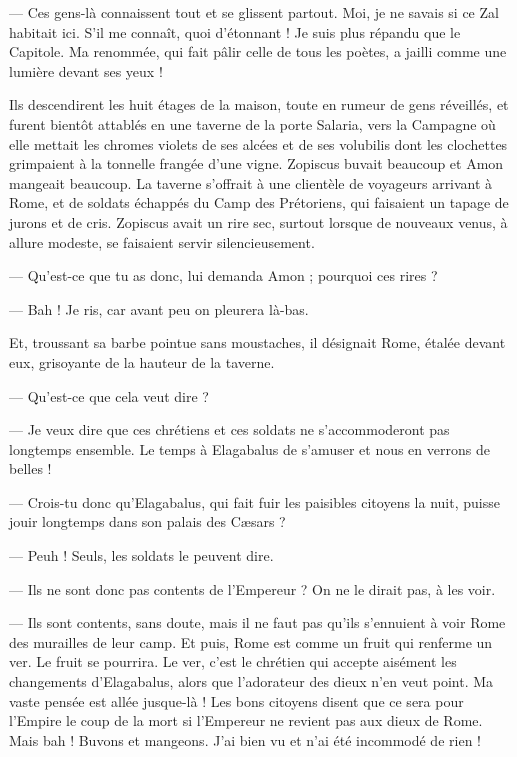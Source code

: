 \documentclass[a4paper, 11pt, oneside, polutonikogreek, french]{article}
\begin{document}
--- Ces gens-là connaissent tout et se glissent partout. Moi, je ne savais si ce Zal habitait ici. S'il me connaît, quoi d'étonnant ! Je suis plus répandu que le Capitole. Ma renommée, qui fait pâlir celle de tous les poètes, a jailli comme une lumière devant ses yeux !

Ils descendirent les huit étages de la maison, toute en rumeur de gens réveillés, et furent bientôt attablés en une taverne de la porte Salaria, vers la Campagne où elle mettait les chromes violets de ses alcées et de ses volubilis dont les clochettes grimpaient à la tonnelle frangée d'une vigne. Zopiscus buvait beaucoup et Amon mangeait beaucoup. La taverne s'offrait à une clientèle de voyageurs arrivant à Rome, et de soldats échappés du Camp des Prétoriens, qui faisaient un tapage de jurons et de cris. Zopiscus avait un rire sec, surtout lorsque de nouveaux venus, à allure modeste, se faisaient servir silencieusement.

--- Qu'est-ce que tu as donc, lui demanda Amon ; pourquoi ces rires ?

--- Bah ! Je ris, car avant peu on pleurera là-bas.

Et, troussant sa barbe pointue sans moustaches, il désignait Rome, étalée devant eux, grisoyante de la hauteur de la taverne.

--- Qu'est-ce que cela veut dire ?

--- Je veux dire que ces chrétiens et ces soldats ne s'accommoderont pas longtemps ensemble. Le temps à Elagabalus de s'amuser et nous en verrons de belles !

--- Crois-tu donc qu'Elagabalus, qui fait fuir les paisibles citoyens la nuit, puisse jouir longtemps dans son palais des Cæsars ?

--- Peuh ! Seuls, les soldats le peuvent dire.

--- Ils ne sont donc pas contents de l'Empereur ? On ne le dirait pas, à les voir.

--- Ils sont contents, sans doute, mais il ne faut pas qu'ils s'ennuient à voir Rome des murailles de leur camp. Et puis, Rome est comme un fruit qui renferme un ver. Le fruit se pourrira. Le ver, c'est le chrétien qui accepte aisément les changements d'Elagabalus, alors que l'adorateur des dieux n'en veut point. Ma vaste pensée est allée jusque-là ! Les bons citoyens disent que ce sera pour l'Empire le coup de la mort si l'Empereur ne revient pas aux dieux de Rome. Mais bah ! Buvons et mangeons. J'ai bien vu et n'ai été incommodé de rien !
\end{document}
